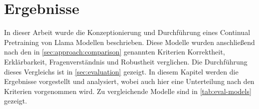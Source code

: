 \chapter{Ergebnisse}\label{ch:results}
\newcommand{\gpt}{\texttt{gpt$4$}}
\newcommand{\lo}{\texttt{llama$2$\_$0$e}}
\newcommand{\liv}{\texttt{llama$2$\_$1$e\_v$100$}}
\newcommand{\lia}{\texttt{llama$2$\_$1$e\_a$30$}}
\newcommand{\lev}{\texttt{llama$2$\_$3$e\_v$100$}}
\newcommand{\lea}{\texttt{llama$2$\_$3$e\_a$30$}}
\newcommand{\lsa}{\texttt{llama$2$\_$5$e\_a$30$}}
\newcommand{\lioa}{\texttt{llama$2$\_$10$e\_a$30$}}

\newcommand{\pic}[4][1]{
    \begin{figure}
        \makebox[\textwidth][c]{\texttt{[image: \#2]}}
        \caption{#3}
        \label{#4}
    \end{figure}
}
\newcommand{\pich}[4][1]{
    \begin{figure}[H]
        \makebox[\textwidth][c]{\texttt{[image: \#2]}}
        \caption{#3}
        \label{#4}
    \end{figure}
}

In dieser Arbeit wurde die Konzeptionierung und Durchführung eines Continual Pretraining von Llama Modellen beschrieben.
Diese Modelle wurden anschließend nach den in \cref{sec:approach:comparison} genannten Kriterien Korrektheit, Erklärbarkeit, Fragenverständnis und Robustheit verglichen.
Die Durchführung dieses Vergleichs ist in \cref{sec:evaluation} gezeigt.
In diesem Kapitel werden die Ergebnisse vorgestellt und analysiert, wobei auch hier eine Unterteilung nach den Kriterien vorgenommen wird.
Zu vergleichende Modelle sind in \cref{tab:eval-models} gezeigt.


